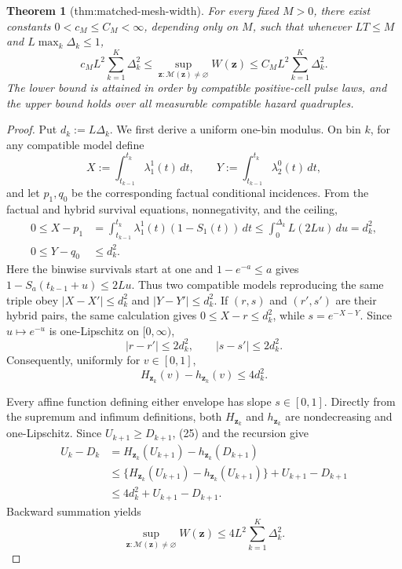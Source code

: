 \documentclass{article}
\newtheorem{theorem}{Theorem}
\begin{document}
\begin{theorem}[thm:matched-mesh-width]\label{thm:matched-mesh-width}
For every fixed \(M>0\), there exist constants \(0<c_M\le C_M<\infty\), depending only on \(M\), such that whenever \(LT\le M\) and \(L\max_k\Delta_k\le1\), \[c_ML^2\sum_{k=1}^K\Delta_k^2\le\sup_{\mathbf z:\mathcal M(\mathbf z)\ne\varnothing}W(\mathbf z)\le C_ML^2\sum_{k=1}^K\Delta_k^2.\] The lower bound is attained in order by compatible positive-cell pulse laws, and the upper bound holds over all measurable compatible hazard quadruples.
\end{theorem}
\begin{proof}
Put \(d_k:=L\Delta_k\).  We first derive a uniform one-bin modulus.  On bin \(k\), for any compatible model define
\[
 X:=\int_{t_{k-1}}^{t_k}\lambda_1^1(t)\,dt,
 \quad\quad Y:=\int_{t_{k-1}}^{t_k}\lambda_2^0(t)\,dt,
\]
and let \(p_1,q_0\) be the corresponding factual conditional incidences.  From the factual and hybrid survival equations, nonnegativity, and the ceiling,
\[
\begin{aligned}
 0\le X-p_1
 &=\int_{t_{k-1}}^{t_k}\lambda_1^1(t)(1-S_1(t))\,dt
 \le\int_0^{\Delta_k}L(2Lu)\,du=d_k^2,\\
 0\le Y-q_0&\le d_k^2.
\end{aligned}                                                \tag{23}
\]
Here the binwise survivals start at one and \(1-e^{-a}\le a\) gives \(1-S_a(t_{k-1}+u)\le2Lu\).  Thus two compatible models reproducing the same triple obey \(|X-X'|\le d_k^2\) and \(|Y-Y'|\le d_k^2\).  If \((r,s)\) and \((r',s')\) are their hybrid pairs, the same calculation gives \(0\le X-r\le d_k^2\), while \(s=e^{-X-Y}\).  Since \(u\mapsto e^{-u}\) is one-Lipschitz on \([0,\infty)\),
\[
 |r-r'|\le2d_k^2,\quad\quad |s-s'|\le2d_k^2.                    \tag{24}
\]
Consequently, uniformly for \(v\in[0,1]\),
\[
 H_{\mathbf z_k}(v)-h_{\mathbf z_k}(v)\le4d_k^2.           \tag{25}
\]

Every affine function defining either envelope has slope \(s\in[0,1]\).  Directly from the supremum and infimum definitions, both \(H_{\mathbf z_k}\) and \(h_{\mathbf z_k}\) are nondecreasing and one-Lipschitz.  Since \(U_{k+1}\ge D_{k+1}\), (25) and the recursion give
\[
\begin{aligned}
 U_k-D_k
 &=H_{\mathbf z_k}(U_{k+1})-h_{\mathbf z_k}(D_{k+1})\\
 &\le \{H_{\mathbf z_k}(U_{k+1})-h_{\mathbf z_k}(U_{k+1})\}
      +U_{k+1}-D_{k+1}\\
 &\le4d_k^2+U_{k+1}-D_{k+1}.
\end{aligned}
\]
Backward summation yields
\[
 \sup_{\mathbf z:\mathcal M(\mathbf z)\ne\varnothing}W(\mathbf z)
 \le4L^2\sum_{k=1}^K\Delta_k^2.                            \tag{26}
\]


\end{proof}
\end{document}
